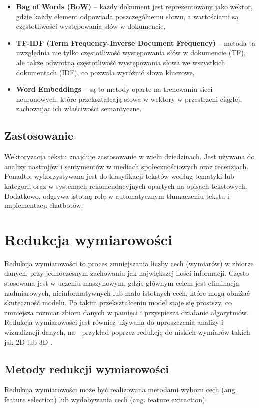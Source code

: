 		\begin{itemize}
			\item \textbf{Bag of Words (BoW)} -- każdy dokument jest reprezentowany jako wektor, gdzie każdy element odpowiada poszczególnemu słowu, a wartościami są częstotliwości występowania słów w dokumencie,
			\item \textbf{TF-IDF (Term Frequency-Inverse Document Frequency)} -- metoda ta uwzględnia nie tylko częstotliwość występowania słów w dokumencie (TF), ale także odwrotną częstotliwość występowania słowa we wszystkich dokumentach (IDF), co pozwala wyróżnić słowa kluczowe,
			\item \textbf{Word Embeddings} -- są to metody oparte na trenowaniu sieci neuronowych, które przekształcają słowa w wektory w przestrzeni ciągłej, zachowując ich właściwości semantyczne.
		\end{itemize}

	\subsection{Zastosowanie}				
		Wektoryzacja tekstu znajduje zastosowanie w wielu dziedzinach. Jest używana do analizy nastrojów i sentymentów w mediach społecznościowych oraz recenzjach. Ponadto, wykorzystywana jest do klasyfikacji tekstów według tematyki lub kategorii oraz w systemach rekomendacyjnych opartych na opisach tekstowych. Dodatkowo, odgrywa istotną rolę w automatycznym tłumaczeniu tekstu i implementacji chatbotów.


\section{Redukcja wymiarowości}

	Redukcja wymiarowości to proces zmniejszania liczby cech (wymiarów) w zbiorze danych, przy jednoczesnym zachowaniu jak największej ilości informacji. Często stosowana jest w uczeniu maszynowym, gdzie głównym celem jest eliminacja nadmiarowych, nieinformatywnych lub mało istotnych cech, które mogą obniżać skuteczność modelu. Po takim przekształceniu model staje się prostszy, co zmniejsza rozmiar zbioru danych w pamięci i przyspiesza działanie algorytmów. Redukcja wymiarowości jest również używana do uproszczenia analizy i wizualizacji danych, na~~przykład poprzez redukcję do niskich wymiarów takich jak 2D lub 3D \cite{DimensionReduction}.

	\subsection{Metody redukcji wymiarowości}
		Redukcja wymiarowości może być realizowana metodami wyboru cech (ang. feature selection) lub wydobywania cech (ang. feature extraction).
		
